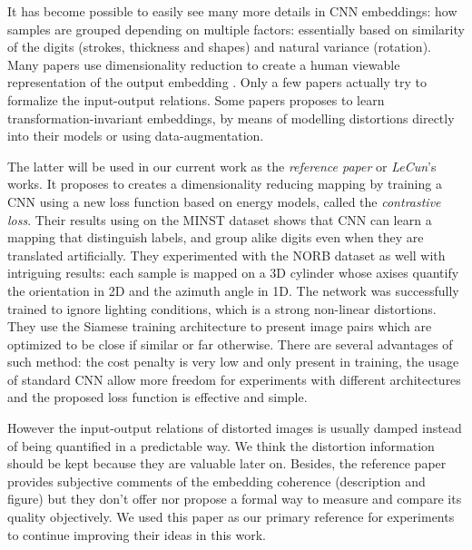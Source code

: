 \documentclass[a4paper,12pt]{report}
\begin{document}
It has become possible to easily see many more details in CNN embeddings: how samples are grouped depending on multiple factors: essentially based on similarity of the digits (strokes, thickness and shapes) and natural variance (rotation).
Many papers use dimensionality reduction to create a human viewable representation of the output embedding \cite{donahue2013decaf}\cite{yu2014visualizing}\cite{yaotiny}.
Only a few papers actually try to formalize the input-output relations\cite{goodfellow2009measuring}.
Some papers proposes to learn transformation-invariant embeddings, by means of modelling distortions directly into their models\cite{gens2014deep} or using data-augmentation\cite{hadsell2006dimensionality}.

The latter will be used in our current work as the {\em reference paper} or {\em LeCun}'s works.
It proposes to creates a dimensionality reducing mapping by training a CNN using a new loss function based on energy models, called the {\em contrastive loss}.
Their results using on the MINST dataset\cite{lecun1998mnist} shows that CNN can learn a mapping that distinguish labels, and group alike digits even when they are translated artificially.
They experimented with the NORB dataset\cite{lecun2004learning} as well with intriguing results: each sample is mapped on a 3D cylinder whose axises quantify the orientation in 2D and the azimuth angle in 1D.
The network was successfully trained to ignore lighting conditions, which is a strong non-linear distortions.
They use the Siamese training architecture to present image pairs which are optimized to be close if similar or far otherwise\cite{bromley1993signature}\cite{chopra2005learning}.
There are several advantages of such method: the cost penalty is very low and only present in training, the usage of standard CNN allow more freedom for experiments with different architectures and the proposed loss function is effective and simple.

However the input-output relations of distorted images is usually damped instead of being quantified in a predictable way.
We think the distortion information should be kept because they are valuable later on.
Besides, the reference paper provides subjective comments of the embedding coherence (description and figure) but they don't offer nor propose a formal way to measure and compare its quality objectively.
We used this paper as our primary reference for experiments to continue improving their ideas in this work.
\end{document}
